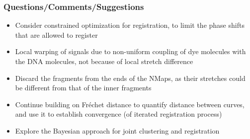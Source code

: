 \documentclass[10pt,dvipsnames,table]{beamer}
\begin{document}
\begin{frame}
\frametitle{Questions/Comments/Suggestions}
\begin{itemize} 
\item Consider constrained optimization for registration, to limit the phase shifts that are allowed to register
\item Local warping of signals due to non-uniform coupling of dye molecules with the DNA molecules, not because of local stretch difference
\item Discard the fragments from the ends of the NMaps, as their stretches could be different from that of the inner fragments
\item Continue building on Fr\'echet distance to quantify distance between curves, and use it to establish convergence (of iterated registration process)
\item Explore the Bayesian approach for joint clustering and registration
\end{itemize}
\end{frame}
\end{document}
